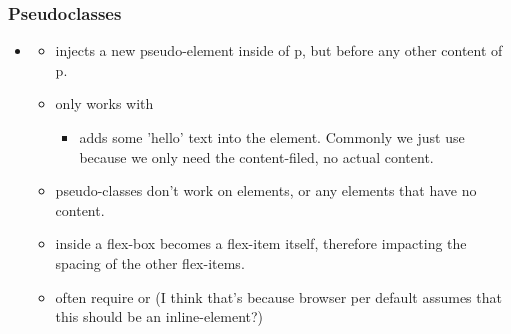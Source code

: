 \subsubsection{Pseudoclasses}
\begin{itemize}
    \item {} \begin{itemize}
        \item injects a new pseudo-element inside of p, but before any other content of p.
        \item only works with  \begin{itemize}
            \item {} adds some 'hello' text into the element. Commonly we just use  because we only need the content-filed, no actual content.
        \end{itemize}
        \item pseudo-classes don't work on  elements, or any elements that have no content.
        \item {} inside a flex-box becomes a flex-item itself, therefore impacting the spacing of the other flex-items.
        \item often require  or  (I think that's because browser per default assumes that this should be an inline-element?)
    \end{itemize}
\end{itemize}


